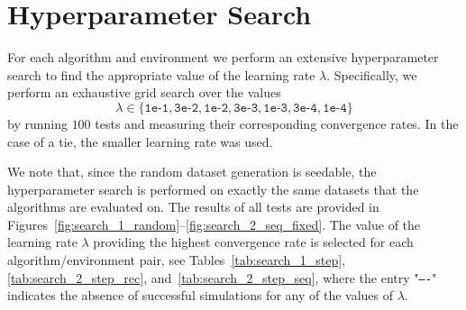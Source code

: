 \documentclass[letterpaper]{article} %
\begin{document}








\clearpage
\appendix


\section{Hyperparameter Search}\label{sec:algorithms}
For each algorithm and environment we perform an extensive hyperparameter search to find the appropriate value of the learning rate $\lambda$.
Specifically, we perform an exhaustive grid search over the values
\[
    \lambda \in \{\texttt{1e-1}, \texttt{3e-2}, \texttt{1e-2}, \texttt{3e-3},
    \texttt{1e-3}, \texttt{3e-4}, \texttt{1e-4}\}
\]
by running $100$ tests and measuring their corresponding convergence rates.
In the case of a tie, the smaller learning rate was used.

We note that, since the random dataset generation is seedable, the hyperparameter search is performed on exactly the same datasets that the algorithms are evaluated on.
The results of all tests are provided in Figures~\ref{fig:search_1_random}--\ref{fig:search_2_seq_fixed}.
The value of the learning rate $\lambda$ providing the highest convergence rate is selected for each algorithm/environment pair, see Tables~\ref{tab:search_1_step}, \ref{tab:search_2_step_rec}, and~\ref{tab:search_2_step_seq}, where the entry "\texttt{----}" indicates the absence of successful simulations for any of the values of $\lambda$.
\end{document}

